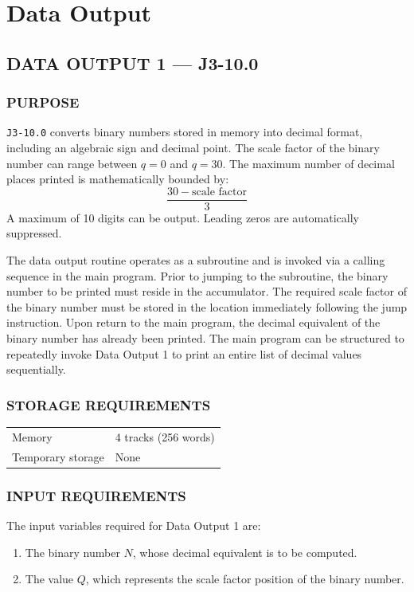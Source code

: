 \section{Data Output}
\subsection*{DATA OUTPUT 1 --- J3-10.0}
\label{sec:data-output-1}

\subsubsection*{PURPOSE}
\texttt{J3-10.0} converts binary numbers stored in memory into decimal format, including an algebraic sign and decimal point. The scale factor of the binary number can range between $q=0$ and $q=30$. The maximum number of decimal places printed is mathematically bounded by:
\[
\frac{30 - \text{scale factor}}{3}
\]
A maximum of 10 digits can be output. Leading zeros are automatically suppressed. 

The data output routine operates as a subroutine and is invoked via a calling sequence in the main program. Prior to jumping to the subroutine, the binary number to be printed must reside in the accumulator. The required scale factor of the binary number must be stored in the location immediately following the jump instruction. Upon return to the main program, the decimal equivalent of the binary number has already been printed. The main program can be structured to repeatedly invoke Data Output 1 to print an entire list of decimal values sequentially.

\subsubsection*{STORAGE REQUIREMENTS}
\begin{center}
\begin{tabular}{ll}
    \toprule
    Memory & 4 tracks (256 words) \\
    Temporary storage    & None \\
    \bottomrule
\end{tabular}
\end{center}

\subsubsection*{INPUT REQUIREMENTS}
The input variables required for Data Output 1 are:
\begin{enumerate}
    \item The binary number $N$, whose decimal equivalent is to be computed.
    \item The value $Q$, which represents the scale factor position of the binary number.
\end{enumerate}

